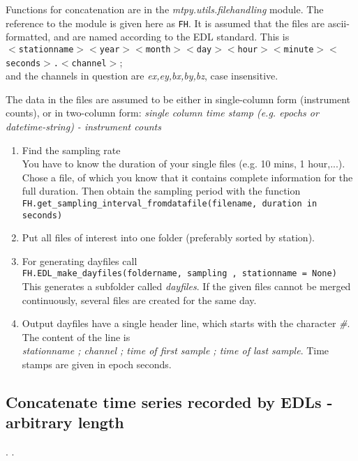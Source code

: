 Functions for concatenation are in the \textit{mtpy.utils.filehandling} module. The reference to the module is given here as   \texttt{FH}. It is assumed that the files are ascii-formatted, and are named according to the EDL standard. This is\\ \texttt{$<$stationname$>$$<$year$>$$<$month$>$$<$day$>$$<$hour$>$$<$minute$>$$<$seconds$>$.$<$channel$>$};\\ and the channels in question are \textit{ex,ey,bx,by,bz}, case insensitive.

The data in the files are assumed to be either in single-column form (instrument counts), or in two-column form: \textit{single column time stamp (e.g. epochs or datetime-string) - instrument counts}

\begin{enumerate}
\item Find the sampling rate{~}\\
You have to know the duration of your single files (e.g. 10 mins, 1 hour,...). Chose a file, of which you know that it contains complete information for the full duration. Then obtain the sampling period with the function \\
\texttt{FH.get\_sampling\_interval\_fromdatafile(filename, duration in seconds)}

\item Put all files of interest into one folder (preferably sorted by station).

\item For generating dayfiles call \\
\texttt{FH.EDL\_make\_dayfiles(foldername, sampling , stationname = None)}\\ This generates a subfolder called \textit{dayfiles}. If the given files cannot be merged continuously, several files are created for the same day.

\item Output dayfiles have a single header line, which starts with the character \textit{\#}. The content of the line is \\  \textit{stationname ; channel ; time of first sample ; time of last sample}. Time stamps are given in epoch seconds.

\end{enumerate}

\subsection{Concatenate time series recorded by EDLs - arbitrary length}
.
.

